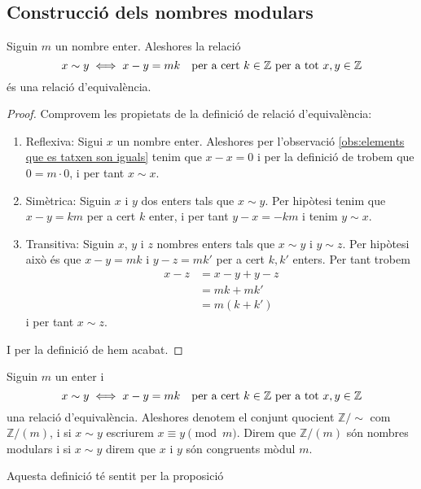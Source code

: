 \documentclass[../../Main.tex]{subfiles}
\begin{document}
	\subsection{Construcció dels nombres modulars}
	\begin{proposition}
		\label{prop:relació d'equivalència Z/(m)}
		Siguin \(m\) un nombre enter. Aleshores la relació
		\[x\sim y\iff x-y=mk\quad\text{per a cert }k\in\mathbb{Z}\text{ per a tot }x,y\in\mathbb{Z}\]
		és una relació d'equivalència.
		\begin{proof}
			Comprovem les propietats de la definició de relació d'equivalència:
			\begin{enumerate}
				\item Reflexiva: Sigui \(x\) un nombre enter. Aleshores per l'observació \ref{obs:elements que es tatxen son iguals} tenim que \(x-x=0\) i per la definició de  trobem que \(0=m\cdot 0\), i per tant \(x\sim x\).
				\item Simètrica: Siguin \(x\) i \(y\) dos enters tals que \(x\sim y\). Per hipòtesi tenim que \(x-y=km\) per a cert \(k\) enter, i per tant \(y-x=-km\) i tenim \(y\sim x\).
				\item Transitiva: Siguin \(x\), \(y\) i \(z\) nombres enters tals que \(x\sim y\) i \(y\sim z\). Per hipòtesi això és que \(x-y=mk\) i \(y-z=mk'\) per a cert \(k,k'\) enters. Per tant trobem
				\begin{align*}
				x-z&=x-y+y-z\\
				&=mk+mk'\\
				&=m(k+k')
				\end{align*}
				i per tant \(x\sim z\).
			\end{enumerate}
			I per la definició de  hem acabat.
		\end{proof}
	\end{proposition}
	\begin{definition}
		\label{def:nombres modulars}\label{def:Z/(m)}
		\label{def:nombres modulars congruents}
		Siguin \(m\) un enter i
		\[x\sim y\iff x-y=mk\quad\text{per a cert }k\in\mathbb{Z}\text{ per a tot }x,y\in\mathbb{Z}\]
		una relació d'equivalència. Aleshores denotem el conjunt quocient \(\mathbb{Z}/\sim\) com \(\mathbb{Z}/(m)\), i si \(x\sim y\) escriurem \(x\equiv y\pmod{m}\). Direm que \(\mathbb{Z}/(m)\) són nombres modulars i si \(x\sim y\) direm que \(x\) i \(y\) són congruents mòdul \(m\).
		
		Aquesta definició té sentit per la proposició 
	\end{definition}
\end{document}
